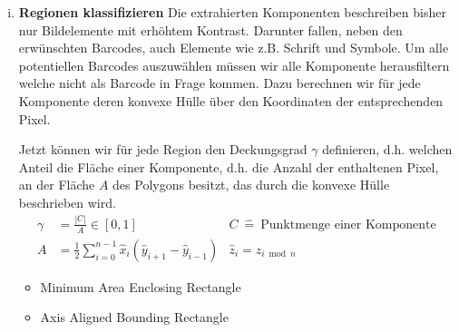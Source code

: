 \begin{enumerate}[(i)]
\item \textbf{Regionen klassifizieren} Die extrahierten Komponenten beschreiben bisher nur Bildelemente mit erhöhtem Kontrast.
Darunter fallen, neben den erwünschten Barcodes, auch Elemente wie z.B. Schrift und Symbole.
Um alle potentiellen Barcodes auszuwählen müssen wir alle Komponente herausfiltern welche nicht als Barcode in Frage kommen.
Dazu berechnen wir für jede Komponente deren konvexe Hülle über den Koordinaten der entsprechenden Pixel.

Jetzt können wir für jede Region den Deckungsgrad $\gamma$ definieren, d.h. welchen Anteil die Fläche einer Komponente, d.h. die Anzahl der enthaltenen Pixel, an der Fläche $A$ des Polygons \cite{braden1986} besitzt, das durch die konvexe Hülle beschrieben wird.
  \begin{align*}
    \gamma &= \frac{|C|}{A} \in [0,1]
           & C~\hat=~\text{Punktmenge einer Komponente} \\
         A &= \frac{1}{2} \sum_{i=0}^{n-1}{\hat x_i (\hat y_{i+1} - \hat y_{i-1})}
           & \hat z_i = z_{i \bmod n}
  \end{align*}

\begin{itemize}
  \item Minimum Area Enclosing Rectangle
  \item Axis Aligned Bounding Rectangle
\end{itemize}


\end{enumerate}
